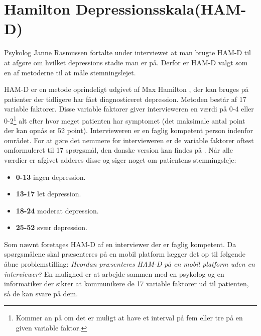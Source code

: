 \section{Hamilton Depressionsskala(HAM-D)}
Psykolog Janne Rasmussen fortalte under interviewet at man brugte HAM-D til at afgøre om hvilket depressions stadie man er på.\cite[Afsnit 1.3, Møde med Psykolog Janne Rasmussen]{faelles}
Derfor er HAM-D valgt som en af metoderne til at måle stemningslejet.

HAM-D er en metode oprindeligt udgivet af Max Hamilton \cite{ham_d}, der kan bruges på patienter der tidligere har fået diagnosticeret depression. 
Metoden består af 17 variable faktorer.
Disse variable faktorer giver intervieweren en værdi på 0-4 eller 0-2\footnote{Kommer an på om det er muligt at have et interval på fem eller tre på en given variable faktor.} alt efter hvor meget patienten har symptomet (det maksimale antal point der kan opnås er 52 point).
Intervieweren er en faglig kompetent person indenfor området.
For at gøre det nemmere for intervieweren er de variable faktorer oftest omformuleret til 17 spørgsmål, den danske version kan findes på \citet{ham_d_dansk}.
Når alle værdier er afgivet adderes disse og siger noget om patientens stemningsleje:
\begin{itemize}
	\item \textbf{0-13} ingen depression.
	\item \textbf{13-17} let depression.
	\item \textbf{18-24} moderat depression.
	\item \textbf{25-52} svær depression.
\end{itemize}

Som nævnt foretages HAM-D af en interviewer der er faglig kompetent.
Da spørgsmålene skal præsenteres på en mobil platform lægger det op til følgende åbne problemstilling: \textit{Hvordan præsenteres HAM-D på en mobil platform uden en interviewer?}
En mulighed er at arbejde sammen med en psykolog og en informatiker der sikrer at kommunikere de 17 variable faktorer ud til patienten, så de kan svare på dem.
